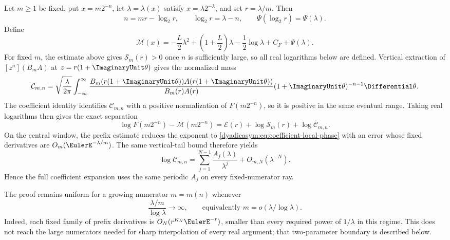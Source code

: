 \documentclass[11pt,oneside]{article}
\theoremstyle{definition}
\theoremstyle{remark}
\begin{document}
Let $m\ge1$ be fixed, put $x=m2^{-n}$, let $\lambda=\lambda(x)$ satisfy
$x=\lambda2^{-\lambda}$, and set $r=\lambda/m$.  Then
\begin{equation}
 n=mr-\log_2r,\qquad \log_2r=\lambda-n,
 \qquad \Psi(\log_2r)=\Psi(\lambda).
 \label{dyadicasym:eq:fixed-ray-phase-lock}
\end{equation}
Define
\begin{equation}
 \mathcal M(x)=-\frac L2\lambda^2+
 \left(1+\frac L2\right)\lambda-\frac12\log\lambda
 +C_F+\Psi(\lambda).
 \label{dyadicasym:eq:general-main}
\end{equation}
For fixed \(m\), the estimate above gives \(\mathcal S_m(r)>0\) once \(n\) is
sufficiently large, so all real logarithms below are defined.  Vertical extraction of
\([z^n](B_mA)\) at \(z=r(1+\ImaginaryUnit\theta)\) gives the normalized mass
\begin{equation}
 \mathcal C_{m,n}
 =\sqrt{\frac{\lambda}{2\pi}}
 \int_{-\infty}^{\infty}
 \frac{B_m(r(1+\ImaginaryUnit\theta))A(r(1+\ImaginaryUnit\theta))}
      {B_m(r)A(r)}
 (1+\ImaginaryUnit\theta)^{-n-1}\Differential\theta.
 \label{dyadicasym:eq:Cmn-def}
\end{equation}
The coefficient identity identifies \(\mathcal C_{m,n}\) with a positive normalization of
\(F(m2^{-n})\), so it is positive in the same eventual range.  Taking real logarithms then
gives the exact separation
\begin{equation}
 \boxed{
 \log F(m2^{-n})-\mathcal M(m2^{-n})
 =\mathcal E(r)+\log\mathcal S_m(r)+\log\mathcal C_{m,n}.}
 \label{dyadicasym:eq:fixed-ray-separation}
\end{equation}
On the central window, the prefix estimate reduces the exponent to
\eqref{dyadicasym:eq:coefficient-local-phase} with an error whose fixed derivatives are
$O_m(\EulerE^{-\lambda/m})$.  The same vertical-tail bound therefore yields
\begin{equation}
 \log\mathcal C_{m,n}
 =\sum_{j=1}^{N-1}\frac{A_j(\lambda)}{\lambda^j}
 +O_{m,N}(\lambda^{-N}).
 \label{dyadicasym:eq:fixed-ray-all-orders}
\end{equation}
Hence the full coefficient expansion uses the same periodic $A_j$ on every fixed-numerator
ray.

The proof remains uniform for a growing numerator $m=m(n)$ whenever
\begin{equation}
 \frac{\lambda/m}{\log\lambda}\longrightarrow\infty,
 \qquad\text{equivalently }m=o(\lambda/\log\lambda).
 \label{dyadicasym:eq:moderate-numerator-condition}
\end{equation}
Indeed, each fixed family of prefix derivatives is
$O_N(r^{K_N}\EulerE^{-r})$, smaller than every required power of $1/\lambda$ in this
regime.  This does not reach the large numerators needed for sharp interpolation of every
real argument; that two-parameter boundary is described below.
\end{document}
